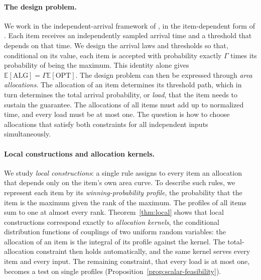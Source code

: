 \documentclass[11pt]{article}
\theoremstyle{definition}
\theoremstyle{remark}
\newcommand{\E}{\mathbb E}
\newcommand{\ALG}{\mathrm{ALG}}
\newcommand{\OPT}{\mathrm{OPT}}
\begin{document}
\paragraph{The design problem.}
We work in the independent-arrival framework of \citet{PT}, in the item-dependent form of
\citet{BC}. Each item receives an independently sampled arrival time and a threshold that
depends on that time. We design the arrival laws and thresholds so that, conditional on its
value, each item is accepted with probability exactly $\Gamma$ times its probability of being
the maximum. This identity alone gives $\E[\ALG]=\Gamma\E[\OPT]$. The design problem can then
be expressed through \emph{area allocations}. The allocation of an item determines its
threshold path, which in turn determines the total arrival probability, or \emph{load}, that
the item needs to sustain the guarantee. The allocations of all items must add up to
normalized time, and every load must be at most one. The question is how to choose
allocations that satisfy both constraints for all independent inputs simultaneously.

\paragraph{Local constructions and allocation kernels.}
We study \emph{local constructions}: a single rule assigns to every item an allocation that
depends only on the item's own area curve. To describe such rules, we represent each item by
its \emph{winning-probability profile}, the probability that the item is the maximum given the
rank of the maximum. The profiles of all items sum to one at almost every rank.
Theorem~\ref{thm:local} shows that local constructions correspond exactly to \emph{allocation
kernels}, the conditional distribution functions of couplings of two uniform random variables:
the allocation of an item is the integral of its profile against the kernel. The
total-allocation constraint then holds automatically, and the same kernel serves every item
and every input. The remaining constraint, that every load is at most one, becomes a test on
single profiles (Proposition~\ref{prop:scalar-feasibility}).
\end{document}

